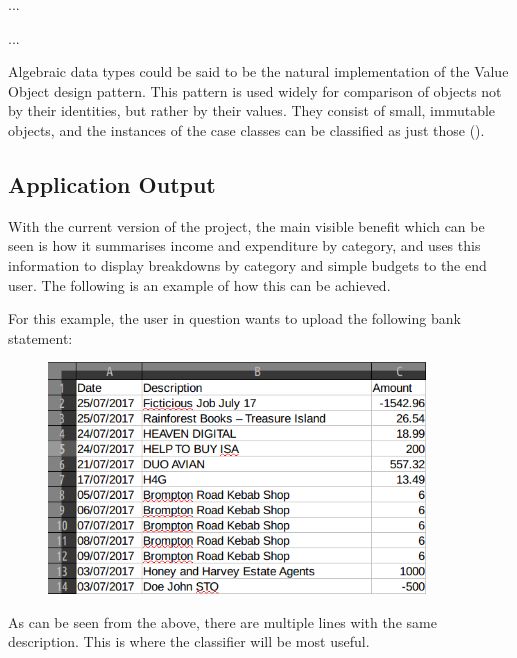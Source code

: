{
  \small
  
}
...

{
  \small
  
}
...

Algebraic data types could be said to be the natural implementation of the
Value Object design pattern. This pattern is used widely for comparison of
objects not by their identities, but rather by their values. They consist of
small, immutable objects, and the instances of the case classes can be
classified as just those (\cite[][Ch.~8,~Location~3068]{nikolov2016scala}).


\subsection{Application Output}

With the current version of the project, the main visible benefit which can be
seen is how it summarises income and expenditure by category, and uses this
information to display breakdowns by category and simple budgets to the end
user. The following is an example of how this can be achieved.

For this example, the user in question wants to upload the following bank
statement:
\begin{figure}[ht!]
  \begin{center}
    \includegraphics[width=10cm]{./contents/img/jul17_statement.png}
  \end{center}
  \caption{}
\end{figure}
\FloatBarrier

As can be seen from the above, there are multiple lines with the same
description. This is where the classifier will be most useful.

